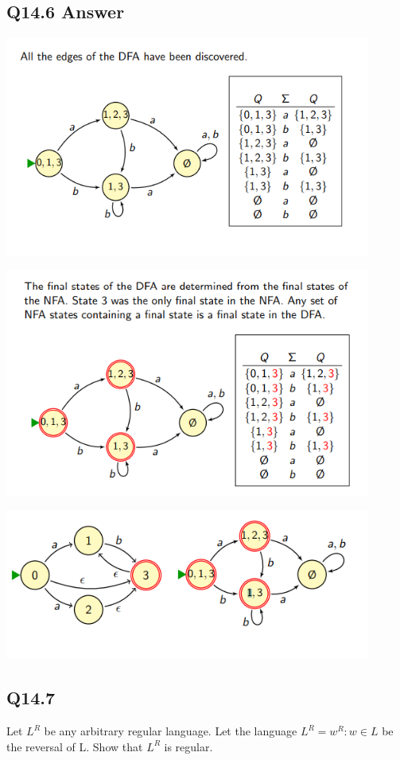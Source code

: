 \documentclass{article}
\begin{document}
\subsection*{Q14.6 Answer}
\begin{center}
    \includegraphics[width=12cm]{7.png}
\end{center}
\begin{center}
    \includegraphics[width=12cm]{8.png}
\end{center}
\begin{center}
    \includegraphics[width=12cm]{9.png}
\end{center}
\newpage
{}
\subsection*{Q14.7}
Let $L^R$ be any arbitrary regular language. Let the language $L^R = {w^R : w \in L}$ be the reversal of L.
Show that $L^R$ is regular.
\newpage
{}
\end{document}
